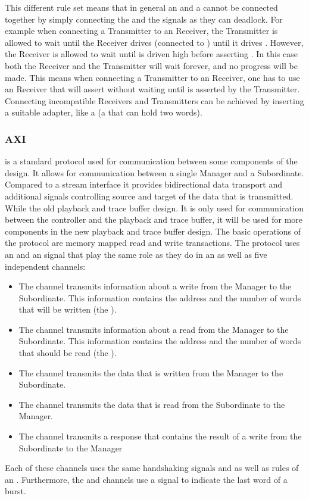 This different rule set means that in general an \AXIStream{} and a \ValidNextStream{} cannot be connected together by simply connecting the \TREADY{} and the \NEXT{} signals as they can deadlock. For example when connecting a \ValidNextStream{} Transmitter to an \AXIStream{} Receiver, the \ValidNextStream{} Transmitter is allowed to wait until the \AXIStream{} Receiver drives \TREADY{} (connected to \NEXT{}) until it drives \TVALID{}. However, the \AXIStream{} Receiver is allowed to wait until \TVALID{} is driven high before asserting \TREADY{}. In this case both the Receiver and the Transmitter will wait forever, and no progress will be made. This means when connecting a \ValidNextStream{} Transmitter to an \AXIStream{} Receiver, one has to use an \AXIStream{} Receiver that will assert \TREADY{} without waiting until \TVALID{} is asserted by the Transmitter. Connecting incompatible Receivers and Transmitters can be achieved by inserting a suitable adapter, like a \SKIDBuffer{} (a \FIFO{} that can hold two words).

\subsubsection{AXI}\label{sec:AXI}
\AXI{}\autocite{ref:axi} is a standard protocol used for communication between some components of the \FPGA{} design. It allows for communication between a single Manager and a Subordinate. Compared to a stream interface it provides bidirectional data transport and additional signals controlling source and target of the data that is transmitted. While the old playback and trace buffer design. It is only used for communication between the \DDR{} controller and the playback and trace buffer, it will be used for more components in the new playback and trace buffer design.
The basic operations of the \AXI{} protocol are memory mapped read and write transactions.
The \AXI{} protocol uses an \ACLK{} and an \ARESETn{} signal that play the same role as they do in an \AXIStream{} as well as five independent channels:
\begin{itemize}
  \item The \AW{} channel transmits information about a write from the Manager to the Subordinate. This information contains the address and the number of words that will be written (the \burstsize{}).
  \item The \AR{} channel transmits information about a read from the Manager to the Subordinate. This information contains the address and the number of words that should be read (the \burstsize{}).
  \item The \W{} channel transmits the data that is written from the Manager to the Subordinate.
  \item The \R{} channel transmits the data that is read from the Subordinate to the Manager.
  \item The \B{} channel transmits a response that contains the result of a write from the Subordinate to the Manager
\end{itemize}
Each of these channels uses the same handshaking signals \READY{} and \VALID{} as well as rules of an \AXIStream{}. Furthermore, the \W{} and \R{} channels use a \LAST{} signal to indicate the last word of a burst.

